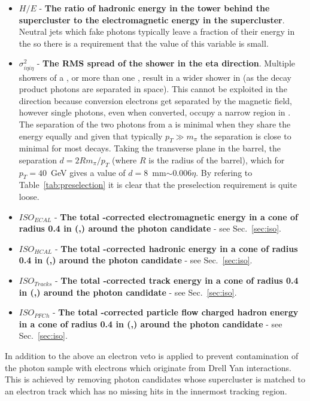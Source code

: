 \begin{itemize}
  \item $H/E$ - \textbf{The ratio of hadronic energy in the \HCAL tower behind the supercluster to the electromagnetic energy in the supercluster}. Neutral jets which fake photons typically leave a fraction of their energy in the \HCAL so there is a requirement that the value of this variable is small.
  \item $\sigma^{2}_{i\eta i\eta}$ - \textbf{The RMS spread of the shower in the eta direction}. Multiple showers of a \pizero, or more than one \pizero, result in a wider shower in \eta (as the \pizero decay product photons are separated in space). This cannot be exploited in the \phi direction because conversion electrons get separated by the magnetic field, however single photons, even when converted, occupy a narrow region in \eta. The separation of the two photons from a \pizero is minimal when they share the energy equally and given that typically $p_{T}\gg m_{\pi}$ the separation is close to minimal for most \pizero decays. Taking the transverse plane in the barrel, the separation $d=2Rm_{\pi}/p_{T}$ (where $R$ is the radius of the barrel), which for $p_{T}=40$~GeV gives a value of $d=$8~mm$\sim0.006\eta$. By refering to Table~\ref{tab:preselection} it is clear that the preselection requirement is quite loose.
  \item $ISO_{ECAL}$ - \textbf{The total \rho-corrected electromagnetic energy in a cone of radius 0.4 in (\eta,\phi) around the photon candidate} - see Sec.~\ref{sec:iso}.
  \item $ISO_{HCAL}$ - \textbf{The total \rho-corrected hadronic energy in a cone of radius 0.4 in (\eta,\phi) around the photon candidate} - see Sec.~\ref{sec:iso}.
  \item $ISO_{Tracks}$ - \textbf{The total \rho-corrected track energy in a cone of radius 0.4 in (\eta,\phi) around the photon candidate} - see Sec.~\ref{sec:iso}.
  \item $ISO_{PFCh}$ - \textbf{The total \rho-corrected particle flow charged hadron energy in a cone of radius 0.4 in (\eta,\phi) around the photon candidate} - see Sec.~\ref{sec:iso}.
\end{itemize}

In addition to the above an electron veto is applied to prevent contamination of the photon sample with electrons which originate from Drell Yan interactions. This is achieved by removing photon candidates whose supercluster is matched to an electron track which has no missing hits in the innermost tracking region.

